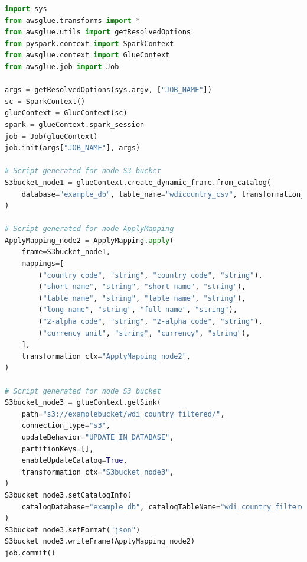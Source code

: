 \begin{lstlisting}[language=Python,caption=Code script generated in AWS Glue for the ETL job created in a visual tool shown in Figure~\ref{fig:visualJob},label=fig:visualScript]
import sys
from awsglue.transforms import *
from awsglue.utils import getResolvedOptions
from pyspark.context import SparkContext
from awsglue.context import GlueContext
from awsglue.job import Job

args = getResolvedOptions(sys.argv, ["JOB_NAME"])
sc = SparkContext()
glueContext = GlueContext(sc)
spark = glueContext.spark_session
job = Job(glueContext)
job.init(args["JOB_NAME"], args)

# Script generated for node S3 bucket
S3bucket_node1 = glueContext.create_dynamic_frame.from_catalog(
    database="example_db", table_name="wdicountry_csv", transformation_ctx="S3bucket_node1"
)

# Script generated for node ApplyMapping
ApplyMapping_node2 = ApplyMapping.apply(
    frame=S3bucket_node1,
    mappings=[
        ("country code", "string", "country code", "string"),
        ("short name", "string", "short name", "string"),
        ("table name", "string", "table name", "string"),
        ("long name", "string", "full name", "string"),
        ("2-alpha code", "string", "2-alpha code", "string"),
        ("currency unit", "string", "currency", "string"),
    ],
    transformation_ctx="ApplyMapping_node2",
)

# Script generated for node S3 bucket
S3bucket_node3 = glueContext.getSink(
    path="s3://examplebucket/wdi_country_filtered/",
    connection_type="s3",
    updateBehavior="UPDATE_IN_DATABASE",
    partitionKeys=[],
    enableUpdateCatalog=True,
    transformation_ctx="S3bucket_node3",
)
S3bucket_node3.setCatalogInfo(
    catalogDatabase="example_db", catalogTableName="wdi_country_filtered"
)
S3bucket_node3.setFormat("json")
S3bucket_node3.writeFrame(ApplyMapping_node2)
job.commit()
\end{lstlisting}

